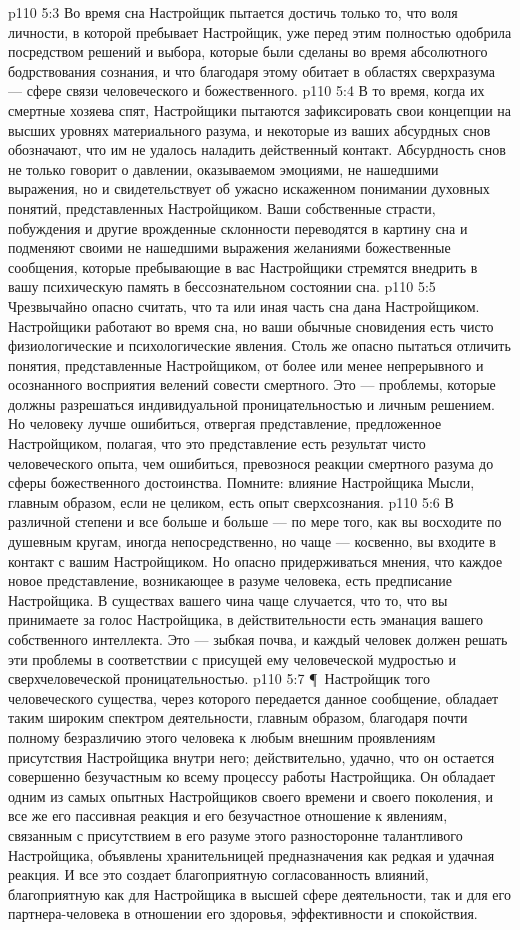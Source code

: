 \vs p110 5:3 Во время сна Настройщик пытается достичь только то, что воля личности, в которой пребывает Настройщик, уже перед этим полностью одобрила посредством решений и выбора, которые были сделаны во время абсолютного бодрствования сознания, и что благодаря этому обитает в областях сверхразума --- сфере связи человеческого и божественного.
\vs p110 5:4 В то время, когда их смертные хозяева спят, Настройщики пытаются зафиксировать свои концепции на высших уровнях материального разума, и некоторые из ваших абсурдных снов обозначают, что им не удалось наладить действенный контакт. Абсурдность снов не только говорит о давлении, оказываемом эмоциями, не нашедшими выражения, но и свидетельствует об ужасно искаженном понимании духовных понятий, представленных Настройщиком. Ваши собственные страсти, побуждения и другие врожденные склонности переводятся в картину сна и подменяют своими не нашедшими выражения желаниями божественные сообщения, которые пребывающие в вас Настройщики стремятся внедрить в вашу психическую память в бессознательном состоянии сна.
\vs p110 5:5 Чрезвычайно опасно считать, что та или иная часть сна дана Настройщиком. Настройщики работают во время сна, но ваши обычные сновидения есть чисто физиологические и психологические явления. Столь же опасно пытаться отличить понятия, представленные Настройщиком, от более или менее непрерывного и осознанного восприятия велений совести смертного. Это --- проблемы, которые должны разрешаться индивидуальной проницательностью и личным решением. Но человеку лучше ошибиться, отвергая представление, предложенное Настройщиком, полагая, что это представление есть результат чисто человеческого опыта, чем ошибиться, превознося реакции смертного разума до сферы божественного достоинства. Помните: влияние Настройщика Мысли, главным образом, если не целиком, есть опыт сверхсознания.
\vs p110 5:6 В различной степени и все больше и больше --- по мере того, как вы восходите по душевным кругам, иногда непосредственно, но чаще --- косвенно, вы входите в контакт с вашим Настройщиком. Но опасно придерживаться мнения, что каждое новое представление, возникающее в разуме человека, есть предписание Настройщика. В существах вашего чина чаще случается, что то, что вы принимаете за голос Настройщика, в действительности есть эманация вашего собственного интеллекта. Это --- зыбкая почва, и каждый человек должен решать эти проблемы в соответствии с присущей ему человеческой мудростью и сверхчеловеческой проницательностью.
\vs p110 5:7 \P\ Настройщик того человеческого существа, через которого передается данное сообщение, обладает таким широким спектром деятельности, главным образом, благодаря почти полному безразличию этого человека к любым внешним проявлениям присутствия Настройщика внутри него; действительно, удачно, что он остается совершенно безучастным ко всему процессу работы Настройщика. Он обладает одним из самых опытных Настройщиков своего времени и своего поколения, и все же его пассивная реакция и его безучастное отношение к явлениям, связанным с присутствием в его разуме этого разносторонне талантливого Настройщика, объявлены хранительницей предназначения как редкая и удачная реакция. И все это создает благоприятную согласованность влияний, благоприятную как для Настройщика в высшей сфере деятельности, так и для его партнера\hyp{}человека в отношении его здоровья, эффективности и спокойствия.
